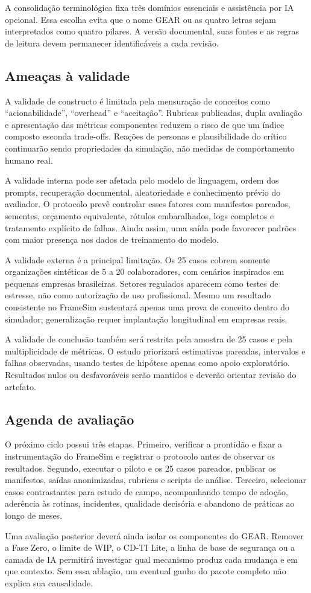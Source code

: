 A consolidação terminológica fixa três domínios essenciais e assistência por IA opcional. Essa escolha evita que o nome GEAR ou as quatro letras sejam interpretados como quatro pilares. A versão documental, suas fontes e as regras de leitura devem permanecer identificáveis a cada revisão.

\subsection{Ameaças à validade}

A validade de constructo é limitada pela mensuração de conceitos como ``acionabilidade'', ``overhead'' e ``aceitação''. Rubricas publicadas, dupla avaliação e apresentação das métricas componentes reduzem o risco de que um índice composto esconda trade-offs. Reações de personas e plausibilidade do crítico continuarão sendo propriedades da simulação, não medidas de comportamento humano real.

A validade interna pode ser afetada pelo modelo de linguagem, ordem dos prompts, recuperação documental, aleatoriedade e conhecimento prévio do avaliador. O protocolo prevê controlar esses fatores com manifestos pareados, sementes, orçamento equivalente, rótulos embaralhados, logs completos e tratamento explícito de falhas. Ainda assim, uma saída pode favorecer padrões com maior presença nos dados de treinamento do modelo.

A validade externa é a principal limitação. Os 25 casos cobrem somente organizações sintéticas de 5 a 20 colaboradores, com cenários inspirados em pequenas empresas brasileiras. Setores regulados aparecem como testes de estresse, não como autorização de uso profissional. Mesmo um resultado consistente no FrameSim sustentará apenas uma prova de conceito dentro do simulador; generalização requer implantação longitudinal em empresas reais.

A validade de conclusão também será restrita pela amostra de 25 casos e pela multiplicidade de métricas. O estudo priorizará estimativas pareadas, intervalos e falhas observadas, usando testes de hipótese apenas como apoio exploratório. Resultados nulos ou desfavoráveis serão mantidos e deverão orientar revisão do artefato.

\subsection{Agenda de avaliação}

O próximo ciclo possui três etapas. Primeiro, verificar a prontidão e fixar a instrumentação do FrameSim e registrar o protocolo antes de observar os resultados. Segundo, executar o piloto e os 25 casos pareados, publicar os manifestos, saídas anonimizadas, rubricas e scripts de análise. Terceiro, selecionar casos contrastantes para estudo de campo, acompanhando tempo de adoção, aderência às rotinas, incidentes, qualidade decisória e abandono de práticas ao longo de meses.

Uma avaliação posterior deverá ainda isolar os componentes do GEAR. Remover a Fase Zero, o limite de WIP, o CD-TI Lite, a linha de base de segurança ou a camada de IA permitirá investigar qual mecanismo produz cada mudança e em que contexto. Sem essa ablação, um eventual ganho do pacote completo não explica sua causalidade.
